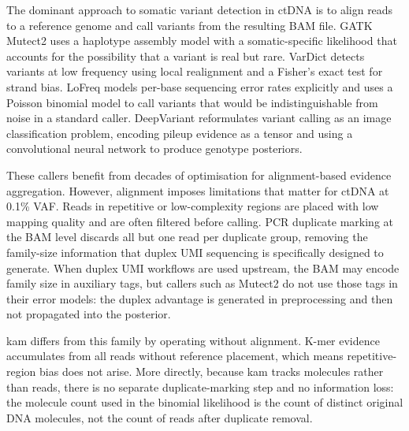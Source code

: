 The dominant approach to somatic variant detection in ctDNA is to align reads to a reference genome and call variants from the resulting BAM file. GATK Mutect2 \autocite{McKenna10gatk} uses a haplotype assembly model with a somatic-specific likelihood that accounts for the possibility that a variant is real but rare. VarDict \autocite{Lai16vardict} detects variants at low frequency using local realignment and a Fisher's exact test for strand bias. LoFreq \autocite{Wilm12lofreq} models per-base sequencing error rates explicitly and uses a Poisson binomial model to call variants that would be indistinguishable from noise in a standard caller. DeepVariant \autocite{Poplin18deepvariant} reformulates variant calling as an image classification problem, encoding pileup evidence as a tensor and using a convolutional neural network to produce genotype posteriors.

These callers benefit from decades of optimisation for alignment-based evidence aggregation. However, alignment imposes limitations that matter for ctDNA at 0.1\% VAF. Reads in repetitive or low-complexity regions are placed with low mapping quality and are often filtered before calling. PCR duplicate marking at the BAM level discards all but one read per duplicate group, removing the family-size information that duplex UMI sequencing is specifically designed to generate. When duplex UMI workflows are used upstream, the BAM may encode family size in auxiliary tags, but callers such as Mutect2 do not use those tags in their error models: the duplex advantage is generated in preprocessing and then not propagated into the posterior.

kam differs from this family by operating without alignment. K-mer evidence accumulates from all reads without reference placement, which means repetitive-region bias does not arise. More directly, because kam tracks molecules rather than reads, there is no separate duplicate-marking step and no information loss: the molecule count used in the binomial likelihood is the count of distinct original DNA molecules, not the count of reads after duplicate removal.
